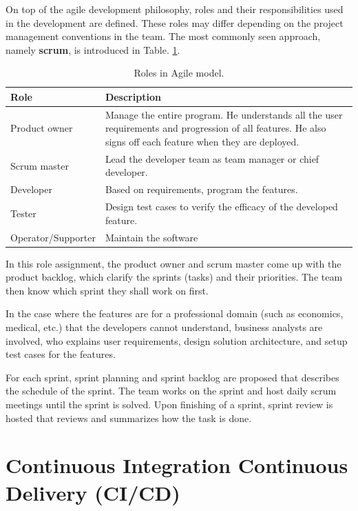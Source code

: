 On top of the agile development philosophy, roles and their responsibilities used in the development are defined. These roles may differ depending on the project management conventions in the team. The most commonly seen approach, namely \textbf{scrum}, is introduced in Table. \ref{ch:cicd:tab:agilerole}. 
\begin{table}[htbp]
	\centering
	\caption{Roles in Agile model.} \label{ch:cicd:tab:agilerole}
	\begin{tabularx}{\textwidth}{lX}
		\hline
		Role & Description \\
		\hline
		Product owner & Manage the entire program. He understands all the user requirements and progression of all features. He also signs off each feature when they are deployed. \\ \hdashline
		Scrum master & Lead the developer team as team manager or chief developer. \\ \hdashline
		Developer & Based on requirements, program the features. \\ \hdashline
		Tester & Design test cases to verify the efficacy of the developed feature. \\ \hdashline
		Operator/Supporter & Maintain the software \\
		\hline
	\end{tabularx}
\end{table}

In this role assignment, the product owner and scrum master come up with the product backlog, which clarify the sprints (tasks) and their priorities. The team then know which sprint they shall work on first.

In the case where the features are for a professional domain (such as economics, medical, etc.) that the developers cannot understand, business analysts are involved, who explains user requirements, design solution architecture, and setup test cases for the features.

For each sprint, sprint planning and sprint backlog are proposed that describes the schedule of the sprint. The team works on the sprint and host daily scrum meetings until the sprint is solved. Upon finishing of a sprint, sprint review is hosted that reviews and summarizes how the task is done.

\section{Continuous Integration Continuous Delivery (CI/CD)}

